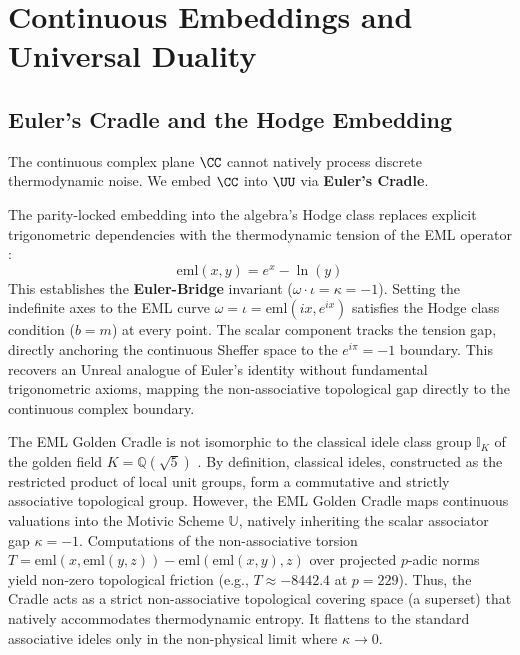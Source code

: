 \section{Continuous Embeddings and Universal Duality}

\subsection{Euler's Cradle and the Hodge Embedding}

The continuous complex plane $\CC$ cannot natively process discrete thermodynamic noise. We embed $\CC$ into $\UU$ via \textbf{Euler's Cradle}.

\begin{definition}\label{def:euler-cradle}
The parity-locked embedding into the algebra's Hodge class replaces explicit trigonometric dependencies with the thermodynamic tension of the EML operator \cite{odrzywolek}:
$$\mathrm{eml}(x,y) = e^x - \ln(y)$$
This establishes the \textbf{Euler-Bridge} invariant ($\omega \cdot \iota = \kappa = -1$). Setting the indefinite axes to the EML curve $\omega = \iota = \mathrm{eml}(i x, e^{ix})$ satisfies the Hodge class condition ($b = m$) at every point. The scalar component tracks the tension gap, directly anchoring the continuous Sheffer space to the $e^{i\pi} = -1$ boundary. This recovers an Unreal analogue of Euler's identity without fundamental trigonometric axioms, mapping the non-associative topological gap directly to the continuous complex boundary.
\end{definition}

\begin{theorem}\label{thm:idele-superset}
The EML Golden Cradle is not isomorphic to the classical idele class group $\mathbb{I}_K$ of the golden field $K = \mathbb{Q}(\sqrt{5})$ \cite{chevalley1936}. By definition, classical ideles, constructed as the restricted product of local unit groups, form a commutative and strictly associative topological group. However, the EML Golden Cradle maps continuous valuations into the Motivic Scheme $\mathbb{U}$, natively inheriting the scalar associator gap $\kappa = -1$. Computations of the non-associative torsion $T = \mathrm{eml}(x, \mathrm{eml}(y, z)) - \mathrm{eml}(\mathrm{eml}(x, y), z)$ over projected $p$-adic norms yield non-zero topological friction (e.g., $T \approx -8442.4$ at $p = 229$). Thus, the Cradle acts as a strict non-associative topological covering space (a superset) that natively accommodates thermodynamic entropy. It flattens to the standard associative ideles only in the non-physical limit where $\kappa \to 0$.
\end{theorem}

